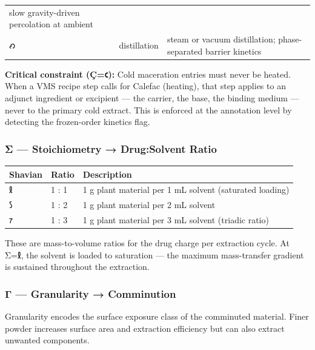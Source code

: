 \begin{longtable}[]{@{}lll@{}}
\begin{minipage}[t]{0.30\columnwidth}
slow gravity-driven percolation at ambient\strut
\end{minipage}\tabularnewline
\begin{minipage}[t]{0.30\columnwidth}\raggedright
𐑺\strut
\end{minipage} & \begin{minipage}[t]{0.30\columnwidth}\raggedright
distillation\strut
\end{minipage} & \begin{minipage}[t]{0.30\columnwidth}\raggedright
steam or vacuum distillation; phase-separated barrier kinetics\strut
\end{minipage}\tabularnewline
\bottomrule
\end{longtable}

\textbf{Critical constraint (Ç=𐑤):} Cold maceration entries must never
be heated. When a VMS recipe step calls for Calefac (heating), that step
applies to an adjunct ingredient or excipient --- the carrier, the base,
the binding medium --- never to the primary cold extract. This is
enforced at the annotation level by detecting the frozen-order kinetics
flag.

\hypertarget{ux3c3-stoichiometry-drugsolvent-ratio}{%
\subsubsection{Σ --- Stoichiometry → Drug:Solvent
Ratio}\label{ux3c3-stoichiometry-drugsolvent-ratio}}

\begin{longtable}[]{@{}lll@{}}
\toprule
Shavian & Ratio & Description\tabularnewline
\midrule
\endhead
𐑙 & 1 : 1 & 1 g plant material per 1 mL solvent (saturated
loading)\tabularnewline
𐑕 & 1 : 2 & 1 g plant material per 2 mL solvent\tabularnewline
𐑳 & 1 : 3 & 1 g plant material per 3 mL solvent (triadic
ratio)\tabularnewline
\bottomrule
\end{longtable}

These are mass-to-volume ratios for the drug charge per extraction
cycle. At Σ=𐑙, the solvent is loaded to saturation --- the maximum
mass-transfer gradient is sustained throughout the extraction.

\hypertarget{ux3b3-granularity-comminution}{%
\subsubsection{Γ --- Granularity →
Comminution}\label{ux3b3-granularity-comminution}}

Granularity encodes the surface exposure class of the comminuted
material. Finer powder increases surface area and extraction efficiency
but can also extract unwanted components.

